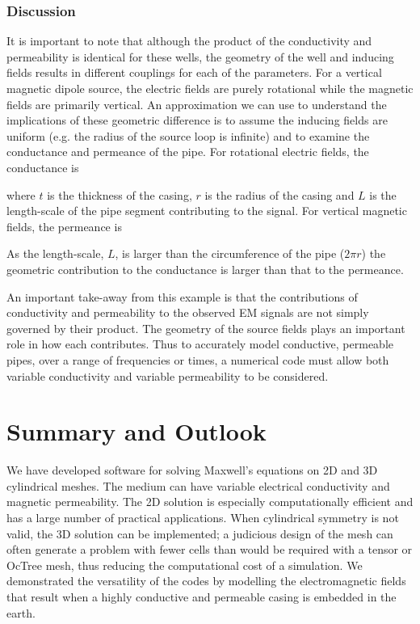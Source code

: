





\subsubsection{Discussion}

It is important to note that although the product of the conductivity and permeability is identical for these wells, the geometry of the well and inducing fields results in different couplings for each of the parameters. For a vertical magnetic dipole source, the electric fields are purely rotational while the magnetic fields are primarily vertical. An approximation we can use to understand the implications of these geometric difference is to assume the inducing fields are uniform (e.g. the radius of the source loop is infinite) and to examine the conductance and permeance of the pipe. For rotational electric fields, the conductance is

where $t$ is the thickness of the casing, $r$ is the radius of the casing and $L$ is the length-scale of the pipe segment contributing to the signal. For vertical magnetic fields, the permeance is

As the length-scale, $L$, is larger than the circumference of the pipe ($2\pi r$) the geometric contribution to the conductance is larger than that to the permeance.

An important take-away from this example is that the contributions of conductivity and permeability to the observed EM signals are not simply governed by their product. The geometry of the source fields plays an important role in how each contributes. Thus to accurately model conductive, permeable pipes, over a range of frequencies or times, a numerical code must allow both variable conductivity and variable permeability to be considered.

\section{Summary and Outlook}

We have developed software for solving Maxwell’s equations on 2D and 3D cylindrical meshes. The medium can have variable electrical conductivity and magnetic permeability. The 2D solution is especially computationally efficient and has a large number of practical applications. When cylindrical symmetry is not valid, the 3D solution can be implemented; a judicious design of the mesh can often generate a problem with fewer cells than would be required with a tensor or OcTree mesh, thus reducing the computational cost of a simulation. We demonstrated the versatility of the codes by modelling the electromagnetic fields that result when a highly conductive and permeable casing is embedded in the earth.

